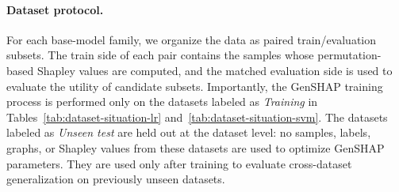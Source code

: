 \paragraph{Dataset protocol.}
For each base-model family, we organize the data as paired train/evaluation subsets. The train side of each pair contains the samples whose permutation-based Shapley values are computed, and the matched evaluation side is used to evaluate the utility of candidate subsets. Importantly, the GenSHAP training process is performed only on the datasets labeled as \emph{Training} in Tables~\ref{tab:dataset-situation-lr} and~\ref{tab:dataset-situation-svm}. The datasets labeled as \emph{Unseen test} are held out at the dataset level: no samples, labels, graphs, or Shapley values from these datasets are used to optimize GenSHAP parameters. They are used only after training to evaluate cross-dataset generalization on previously unseen datasets.

